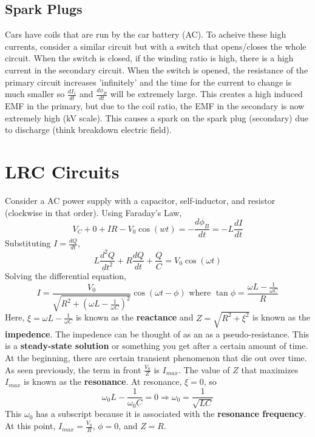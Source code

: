 \documentclass{article}
\begin{document}
\subsection{Spark Plugs}
Cars have coils that are run by the car battery (AC). To acheive these high currents, consider a similar circuit
but with a switch that opens/closes the whole circuit. When the switch is closed, if the winding ratio is high, there is
a high current in the secondary circuit. When the switch is opened, the resistance of the primary circuit increases 'infinitely'
and the time for the current to change is much smaller so $\frac{dI_{1}}{dt}$ and $\frac{d\phi_{B}}{dt}$ will be extremely large.
This creates a high induced EMF in the primary, but due to the coil ratio, the EMF in the secondary is now extremely high (kV scale).
This causes a spark on the spark plug (secondary) due to discharge (think breakdown electric field).

\section{LRC Circuits}
Consider a AC power supply with a capacitor, self-inductor, and resistor (clockwise in that order).
Using Faraday's Law,
$$V_{C}+0+IR-V_{0}\cos (wt)=-\frac{d\phi_{B}}{dt}=-L\frac{dI}{dt}$$
Substituting $I=\frac{dQ}{dt}$,
$$L\frac{d^{2}Q}{dt^{2}}+R\frac{dQ}{dt}+\frac{Q}{C}=V_{0}\cos(\omega t)$$
Solving the differential equation, 
$$I=\frac{V_{0}}{\sqrt{R^{2}+\left(\omega L-\frac{1}{\omega C}\right)^{2}}}\cos(\omega t-\phi)
\text{ where }\tan\phi=\frac{\omega L-\frac{1}{\omega C}}{R}$$
Here, $\xi=\omega L-\frac{1}{\omega C}$ is known as the \textbf{reactance} and 
$Z=\sqrt{R^{2}+\xi^{2}}$ is known as the \textbf{impedence}. The impedence can be thought of as an 
as a pseudo-resistance. This is a \textbf{steady-state solution} or something you get after a certain amount of time.
At the beginning, there are certain transient phenomenon that die out over time. As seen previously, 
the term in front $\frac{V_{0}}{Z}$ is $I_{max}$. The value of $Z$ that maximizes $I_{max}$
is known as the \textbf{resonance}. At resonance, $\xi=0$, so
$$\omega_{0}L-\frac{1}{\omega_{0}C}=0 \Rightarrow \omega_{0}=\frac{1}{\sqrt{LC}}$$
This $\omega_{0}$ has a subscript because it is associated with the \textbf{resonance frequency}.
At this point, $I_{max}=\frac{V_{0}}{R}$, $\phi=0$, and $Z=R$.
\end{document}
